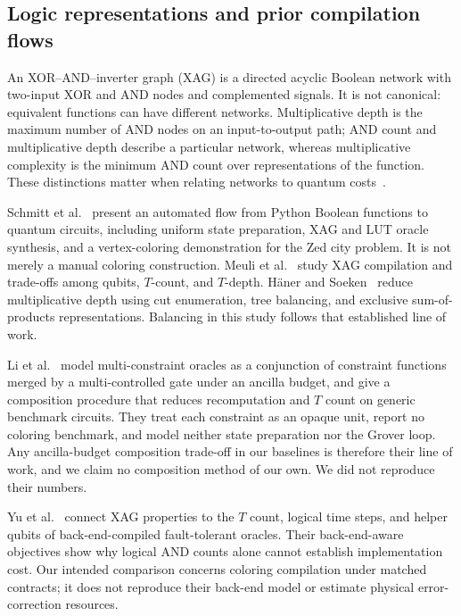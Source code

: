 \documentclass[sigconf, natbib]{acmart}
\begin{document}
\subsection{Logic representations and prior compilation flows}
\label{subsec:related-logic}
An XOR--AND--inverter graph (XAG) is a directed acyclic Boolean network with two-input XOR and AND nodes and complemented signals. It is not canonical: equivalent functions can have different networks. Multiplicative depth is the maximum number of AND nodes on an input-to-output path; AND count and multiplicative depth describe a particular network, whereas multiplicative complexity is the minimum AND count over representations of the function. These distinctions matter when relating networks to quantum costs~\cite{XAGCompilation,XAG_npj,HaenerSoekenDepth}.

Schmitt et al.~\cite{DATE21} present an automated flow from Python Boolean functions to quantum circuits, including uniform state preparation, XAG and LUT oracle synthesis, and a vertex-coloring demonstration for the Zed city problem. It is not merely a manual coloring construction. Meuli et al.~\cite{XAGCompilation,XAG_npj} study XAG compilation and trade-offs among qubits, $T$-count, and $T$-depth. H\"aner and Soeken~\cite{HaenerSoekenDepth} reduce multiplicative depth using cut enumeration, tree balancing, and exclusive sum-of-products representations. Balancing in this study follows that established line of work.

Li et al.~\cite{LiFORM} model multi-constraint oracles as a conjunction of constraint functions merged by a multi-controlled gate under an ancilla budget, and give a composition procedure that reduces recomputation and $T$ count on generic benchmark circuits. They treat each constraint as an opaque unit, report no coloring benchmark, and model neither state preparation nor the Grover loop. Any ancilla-budget composition trade-off in our baselines is therefore their line of work, and we claim no composition method of our own. We did not reproduce their numbers.

Yu et al.~\cite{YuBackend2025} connect XAG properties to the $T$ count, logical time steps, and helper qubits of back-end-compiled fault-tolerant oracles. Their back-end-aware objectives show why logical AND counts alone cannot establish implementation cost. Our intended comparison concerns coloring compilation under matched contracts; it does not reproduce their back-end model or estimate physical error-correction resources.
\end{document}
